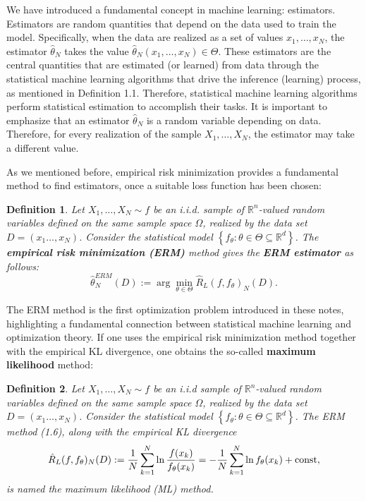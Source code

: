 \documentclass{report}
\newtheorem{definition}{Definition}[chapter]
\begin{document}
We have introduced a fundamental concept in machine learning: estimators. Estimators are random quantities that depend on the data used to train the model. Specifically, when the data are realized as a set of values $x_1,\dots,x_N$, the estimator $\hat{\theta}_N$ takes the value $\hat{\theta}_N(x_1,\dots,x_N) \in \Theta$. These estimators are the central quantities that are estimated (or learned) from data through the statistical machine learning algorithms that drive the inference (learning) process, as mentioned in Definition 1.1. Therefore, statistical machine learning algorithms perform statistical estimation to accomplish their tasks. It is important to emphasize that an estimator $\hat{\theta}_N$ is a random variable depending on data. Therefore, for
every realization of the sample $X_1,\dots,X_N$, the estimator may take a different value.

As we mentioned before, empirical risk minimization provides a fundamental method to find estimators, once a suitable loss function has been chosen:
\begin{definition}
Let $X_1,\dots,X_N \sim f$ be an i.i.d. sample of $\mathbb{R}^n$-valued random variables defined on the same sample space $\Omega$, realized by the data set $D =(x_1\dots,x_N)$. Consider the statistical model $\left\{f_\theta : \theta \in \Theta \subseteq \mathbb{R}^d\right\}$. The \textbf{empirical risk minimization (ERM)} method gives the \textbf{ERM estimator} as follows:
\begin{equation}
\hat{\theta}^{ERM}_N(D) := \arg\min_{\theta \in \Theta}\hat{R}_L(f,f_\theta)_N(D).
\end{equation}
\end{definition}

The ERM method is the first optimization problem introduced in these notes, highlighting a fundamental connection between statistical machine learning and optimization theory. If one uses the empirical risk minimization method together with the empirical KL divergence, one obtains the so-called \textbf{maximum likelihood} method:

\begin{definition}
Let $X_1,\dots,X_N \sim f$ be an i.i.d sample of $\mathbb{R}^n$-valued random variables defined on the same sample space $\Omega$, realized by the data set $D=(x_1\dots,x_N)$. Consider the statistical model $\left\{f_\theta : \theta \in \Theta \subseteq \mathbb{R}^d\right\}$. The ERM method (1.6), along with the empirical KL divergence
\begin{equation}
\hat{R}_L(f,f_\theta)_N(D) := \frac{1}{N}\sum_{k=1}^{N}\ln\frac{f(x_k)}{f_\theta(x_k)} = -\frac{1}{N}\sum_{k=1}^{N}\ln f_\theta(x_k) + \textup{const},
\end{equation}
is named the maximum likelihood (ML) method.
\end{definition}
\end{document}
